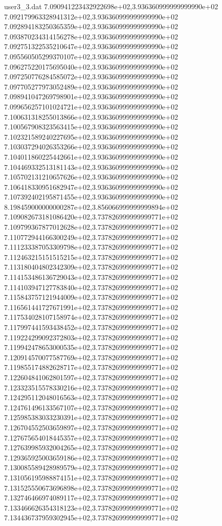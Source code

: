 \begin{filecontents}{user3_3.dat}
7.090941223432922698e+02,3.936360999999999990e+02
7.092179963328941312e+02,3.936360999999999990e+02
7.092894183250365359e+02,3.936360999999999990e+02
7.093870234314156278e+02,3.936360999999999990e+02
7.092751322535210647e+02,3.936360999999999990e+02
7.095560505299370107e+02,3.936360999999999990e+02
7.096275220175695040e+02,3.936360999999999990e+02
7.097250776284585072e+02,3.936360999999999990e+02
7.097705277973052489e+02,3.936360999999999990e+02
7.098941047269798901e+02,3.936360999999999990e+02
7.099656257101024721e+02,3.936360999999999990e+02
7.100631318255013866e+02,3.936360999999999990e+02
7.100567908323563415e+02,3.936360999999999990e+02
7.102321589240227695e+02,3.936360999999999990e+02
7.103037294026353266e+02,3.936360999999999990e+02
7.104011860225442661e+02,3.936360999999999990e+02
7.104469332513181143e+02,3.936360999999999990e+02
7.105702131210657626e+02,3.936360999999999990e+02
7.106418330951682947e+02,3.936360999999999990e+02
7.107392402195871455e+02,3.936360999999999990e+02
8.198459000000000287e+02,3.856066999999999894e+02
7.109082673181086420e+02,3.737826999999999771e+02
7.109799367877012628e+02,3.737826999999999771e+02
7.110772944166300249e+02,3.737826999999999771e+02
7.111233387053309798e+02,3.737826999999999771e+02
7.112463215151515215e+02,3.737826999999999771e+02
7.113180404802342309e+02,3.737826999999999771e+02
7.114153486136729043e+02,3.737826999999999771e+02
7.114103947127783840e+02,3.737826999999999771e+02
7.115843757121944009e+02,3.737826999999999771e+02
7.116561441727671991e+02,3.737826999999999771e+02
7.117534028107158974e+02,3.737826999999999771e+02
7.117997441593438452e+02,3.737826999999999771e+02
7.119224299092372803e+02,3.737826999999999771e+02
7.119942478653000535e+02,3.737826999999999771e+02
7.120914570077587769e+02,3.737826999999999771e+02
7.119855174882628717e+02,3.737826999999999771e+02
7.122604841062801597e+02,3.737826999999999771e+02
7.123323515578330216e+02,3.737826999999999771e+02
7.124295112048016563e+02,3.737826999999999771e+02
7.124761496133567107e+02,3.737826999999999771e+02
7.125985383033230391e+02,3.737826999999999771e+02
7.126704552503659897e+02,3.737826999999999771e+02
7.127675654018445357e+02,3.737826999999999771e+02
7.127639985932004265e+02,3.737826999999999771e+02
7.129365925003659186e+02,3.737826999999999771e+02
7.130085589428989579e+02,3.737826999999999771e+02
7.131056195988874151e+02,3.737826999999999771e+02
7.131525550673696898e+02,3.737826999999999771e+02
7.132746466974089117e+02,3.737826999999999771e+02
7.133466626354318123e+02,3.737826999999999771e+02
7.134436737959302945e+02,3.737826999999999771e+02

\end{filecontents}
